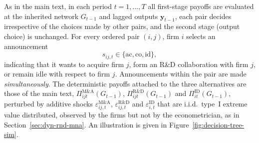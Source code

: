 As in the main text, in each period $t = 1, \dots, T$ all first-stage
payoffs are evaluated at the inherited network $G_{t-1}$ and lagged
outputs $\mathbf{y}_{t-1}$, each pair decides irrespective of the
choices made by other pairs, and the second stage (output choice) is
unchanged. For every ordered pair $(i,j)$, firm $i$ selects an
announcement
\begin{equation}
  s_{ij,t} \in \{\mathrm{ac}, \mathrm{co}, \mathrm{id}\},
  \label{eq:app:actions}
\end{equation}
indicating that it wants to acquire firm $j$, form an R\&D collaboration
with firm $j$, or remain idle with respect to firm $j$. Announcements
within the pair are made \emph{simultaneously}. The deterministic
payoffs attached to the three alternatives are those of the main text,
$\Pi^{\mathrm{M\&A}}_{ijt}(G_{t-1})$,
$\Pi^{\mathrm{R\&D}}_{ijt}(G_{t-1})$ and
$\Pi^{\mathrm{ID}}_{it}(G_{t-1})$, perturbed by additive shocks
$\varepsilon^{\mathrm{M\&A}}_{ij,t}$,
$\varepsilon^{\mathrm{R\&D}}_{ij,t}$ and
$\varepsilon^{\mathrm{ID}}_{i,t}$ that are i.i.d.\ type~I extreme value
distributed, observed by the firms but not by the econometrician, as in
Section~\ref{sec:dyn-rnd-mna}. An illustration is given in
Figure~\ref{fig:decision-tree-sim}.

